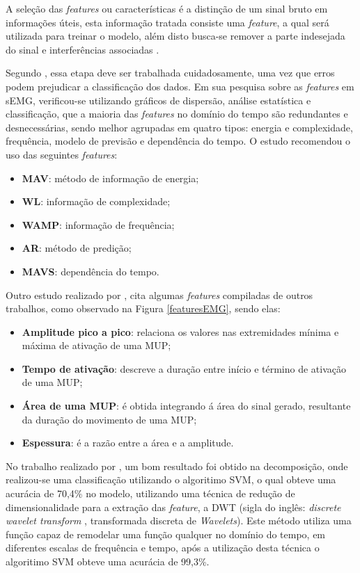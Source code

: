 A seleção das \textit{features} ou características é a distinção de um sinal bruto em informações úteis, esta informação tratada consiste uma \textit{feature}, a qual será utilizada para treinar o modelo, além disto busca-se remover a parte indesejada do sinal e interferências associadas \cite{phinyomark2012feature}.

Segundo , essa etapa deve ser trabalhada cuidadosamente, uma vez que erros podem prejudicar a classificação dos dados. Em sua pesquisa sobre as \textit{features} em sEMG, verificou-se utilizando gráficos de dispersão, análise estatística e classificação, que a maioria das \textit{features} no domínio do tempo são redundantes e desnecessárias, sendo melhor agrupadas em quatro tipos: energia e complexidade, frequência, modelo de previsão e dependência do tempo. O estudo recomendou o uso das seguintes \textit{features}:

\begin{itemize}
    \item \textbf{MAV}: método de informação de energia;
    \item \textbf{WL}: informação de complexidade;
    \item \textbf{WAMP}: informação de frequência;
    \item \textbf{AR}: método de predição;
    \item \textbf{MAVS}: dependência do tempo.
\end{itemize}

Outro estudo realizado por , cita algumas \textit{features} compiladas de outros trabalhos, como observado na Figura \ref{featuresEMG}, sendo elas:

\begin{itemize}
    \item \textbf{Amplitude pico a pico}: relaciona os valores nas extremidades mínima e máxima de ativação de uma MUP;
    \item \textbf{Tempo de ativação}: descreve a duração entre início e término de ativação de uma MUP;
    \item \textbf{Área de uma MUP}: é obtida integrando á área do sinal gerado, resultante da duração do movimento de uma MUP;
    \item \textbf{Espessura}: é a razão entre a área e a amplitude.
\end{itemize}

No trabalho realizado por , um bom resultado foi obtido na decomposição, onde realizou-se uma classificação utilizando o algoritimo SVM, o qual obteve uma acurácia de 70,4\% no modelo, utilizando uma técnica de redução de dimensionalidade para a extração das \textit{feature}, a DWT (sigla do inglês: \textit{discrete wavelet transform }, transformada discreta de \textit{Wavelets}). Este método utiliza uma função capaz de remodelar uma função qualquer no domínio do tempo, em diferentes escalas de frequência e tempo, após a utilização desta técnica o algoritimo SVM obteve uma acurácia de 99,3\%.

